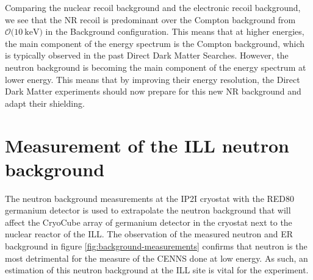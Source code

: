Comparing the nuclear recoil background and the electronic recoil background, we see that the NR recoil is predominant over the Compton background from $\mathcal{O}(\SI{10}{\kilo\eV)}$ in the Background configuration. This means that at higher energies, the main component of the energy spectrum is the Compton background, which is typically observed in the past Direct Dark Matter Searches. However, the neutron background is becoming the main component of the energy spectrum at lower energy. This means that by improving their energy resolution, the Direct Dark Matter experiments should now prepare for this new NR background and adapt their shielding. 


\section{Measurement of the ILL neutron background}
\label{par:ill-neutron-background}

The neutron background measurements at the IP2I cryostat with the RED80 germanium detector is used to extrapolate the neutron background that will affect the CryoCube array of germanium detector in the \Ricochet{} cryostat next to the nuclear reactor of the ILL. The observation of the measured neutron and ER background in figure \ref{fig:background-measurements} confirms that neutron is the most detrimental  for the measure of the CENNS done at low energy. As such, an estimation of this neutron background at the ILL site is vital for the \Ricochet{} experiment.

